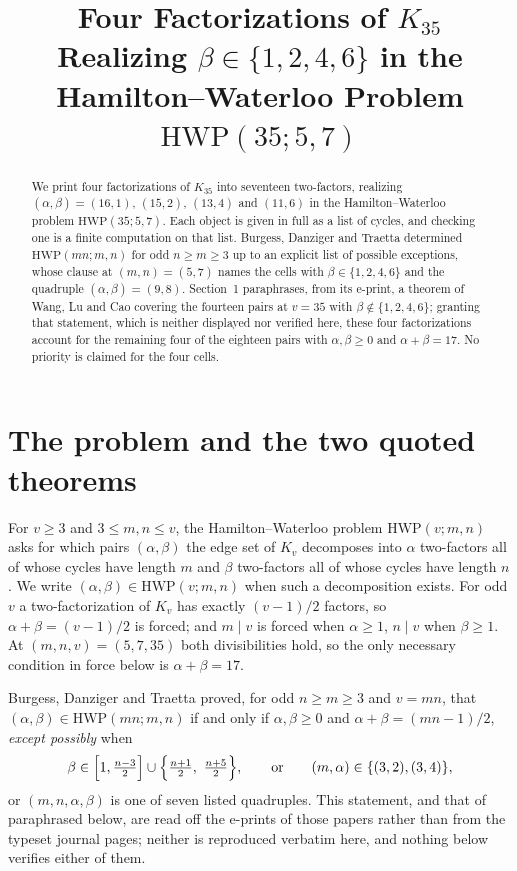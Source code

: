 \documentclass[11pt]{amsart}
\title[Four factorizations of $K_{35}$]{Four Factorizations of \texorpdfstring{$K_{35}$}{K\_35}
Realizing \texorpdfstring{$\beta\in\{1,2,4,6\}$}{beta = 1, 2, 4, 6} in the Hamilton--Waterloo
Problem \texorpdfstring{$\mathrm{HWP}(35;5,7)$}{HWP(35;5,7)}}
\date{}
\newcommand{\HWP}{\mathrm{HWP}}
\begin{document}
\begin{abstract}
We print four factorizations of $K_{35}$ into seventeen two-factors,
realizing $(\alpha,\beta)=(16,1)$, $(15,2)$, $(13,4)$ and $(11,6)$ in
the Hamilton--Waterloo problem $\HWP(35;5,7)$. Each object is given in
full as a list of cycles, and checking one is a finite computation on
that list. Burgess, Danziger and Traetta determined $\HWP(mn;m,n)$ for
odd $n\ge m\ge3$ up to an explicit list of possible exceptions, whose
clause at $(m,n)=(5,7)$ names the cells with $\beta\in\{1,2,4,6\}$ and
the quadruple $(\alpha,\beta)=(9,8)$. Section~1 paraphrases, from its
e-print, a theorem of Wang, Lu and Cao covering the fourteen pairs at
$v=35$ with $\beta\notin\{1,2,4,6\}$; granting that statement, which is
neither displayed nor verified here, these four factorizations account
for the remaining four of the eighteen pairs with $\alpha,\beta\ge0$ and
$\alpha+\beta=17$. No priority is claimed for the four cells.
\end{abstract}

\maketitle

\section{The problem and the two quoted theorems}

For $v\ge3$ and $3\le m,n\le v$, the Hamilton--Waterloo problem
$\HWP(v;m,n)$ asks for which pairs $(\alpha,\beta)$ the edge set of
$K_v$ decomposes into $\alpha$ two-factors all of whose cycles have
length $m$ and $\beta$ two-factors all of whose cycles have length $n$.
We write $(\alpha,\beta)\in\HWP(v;m,n)$ when such a decomposition
exists. For odd $v$ a two-factorization of $K_v$ has exactly
$(v-1)/2$ factors, so $\alpha+\beta=(v-1)/2$ is forced; and $m\mid v$
is forced when $\alpha\ge1$, $n\mid v$ when $\beta\ge1$. At
$(m,n,v)=(5,7,35)$ both divisibilities hold, so the only necessary
condition in force below is $\alpha+\beta=17$.

Burgess, Danziger and Traetta \cite{BDT17} proved, for odd $n\ge m\ge3$
and $v=mn$, that $(\alpha,\beta)\in\HWP(mn;m,n)$ if and only if
$\alpha,\beta\ge0$ and $\alpha+\beta=(mn-1)/2$, \emph{except possibly}
when
\[
  \beta\in\Bigl[1,\tfrac{n-3}{2}\Bigr]\cup
  \Bigl\{\tfrac{n+1}{2},\ \tfrac{n+5}{2}\Bigr\},
  \qquad\text{or}\qquad
  (m,\alpha)\in\{(3,2),(3,4)\},
\]
or $(m,n,\alpha,\beta)$ is one of seven listed quadruples. This
statement, and that of \cite{WLC} paraphrased below, are read off the
e-prints of those papers rather than from the typeset journal pages;
neither is reproduced verbatim here, and nothing below verifies either
of them.
\end{document}
